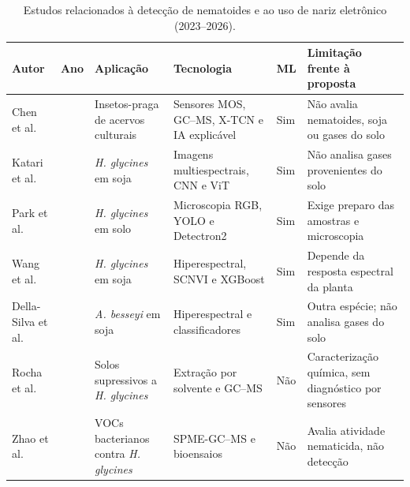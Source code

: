 \begin{table}[!t]
\centering
\caption{Estudos relacionados à detecção de nematoides e ao uso de nariz eletrônico (2023--2026).}
\label{tab:trabalhos_relacionados_nematoides}

\renewcommand{\arraystretch}{1.20}
\setlength{\tabcolsep}{3.5pt}
\footnotesize

\begin{tabularx}{\textwidth}{@{}
>{\raggedright\arraybackslash}p{2.15cm}
>{\centering\arraybackslash}p{0.85cm}
>{\raggedright\arraybackslash}p{2.45cm}
>{\raggedright\arraybackslash}p{2.85cm}
>{\centering\arraybackslash}p{0.95cm}
>{\raggedright\arraybackslash}X
@{}}

\toprule
\textbf{Autor} &
\textbf{Ano} &
\textbf{Aplicação} &
\textbf{Tecnologia} &
\textbf{ML} &
\textbf{Limitação frente à proposta} \\
\midrule

Chen et al. \cite{chen2026xtcn}
& 2026
& Insetos-praga de acervos culturais
& Sensores MOS, GC--MS, X-TCN e IA explicável
& Sim
& Não avalia nematoides, soja ou gases do solo \\

Katari et al. \cite{katari2026}
& 2026
& \textit{H. glycines} em soja
& Imagens multiespectrais, CNN e ViT
& Sim
& Não analisa gases provenientes do solo \\

Park et al. \cite{park2026}
& 2026
& \textit{H. glycines} em solo
& Microscopia RGB, YOLO e Detectron2
& Sim
& Exige preparo das amostras e microscopia \\

Wang et al. \cite{wang2025scn}
& 2025
& \textit{H. glycines} em soja
& Hiperespectral, SCNVI e XGBoost
& Sim
& Depende da resposta espectral da planta \\

Della-Silva et al. \cite{dellasilva2025}
& 2025
& \textit{A. besseyi} em soja
& Hiperespectral e classificadores
& Sim
& Outra espécie; não analisa gases do solo \\

Rocha et al. \cite{rocha2023}
& 2023
& Solos supressivos a \textit{H. glycines}
& Extração por solvente e GC--MS
& Não
& Caracterização química, sem diagnóstico por sensores \\

Zhao et al. \cite{zhao2025}
& 2025
& VOCs bacterianos contra \textit{H. glycines}
& SPME-GC--MS e bioensaios
& Não
& Avalia atividade nematicida, não detecção \\


\end{tabularx}
\end{table}
